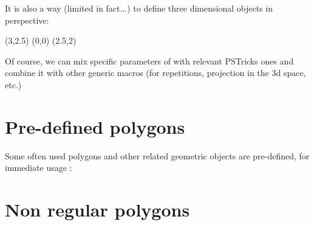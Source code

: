 \documentclass[11pt,english,BCOR10mm,DIV12,bibliography=totoc,parskip=false,smallheadings
    headexclude,footexclude,oneside]{pst-doc}
\begin{document}
\begin{compactdesc}
It is also a way (limited in fact...) to define three dimensional objects in perspective:

\bigskip
\begin{LTXexample}[pos=l,width=0.3\linewidth,pos=l]
\begin{pspicture}(3,2.5)
  \rput[lb](0,0){\PstSquare[PolyName=A]}
    \rput[lb](2.5,2){\PstSquare[unit=0.5,PolyName=B]}
  \end{pspicture}
\end{LTXexample}

\end{compactdesc}

\bigskip
  Of course, we can mix specific parameters of  with
relevant PSTricks ones and combine it with other generic macros
(for repetitions, projection in the 3d space, etc.)


\begin{LTXexample}[pos=t]
  \PstPolygon[unit=1.5]
  \PstPolygon[linewidth=1mm]
  \PstPolygon[fillstyle=crosshatch,PolyNbSides=6]
  \PstPolygon[linecolor=red,fillstyle=solid,fillcolor=yellow,
              PolyRotation=18,PolyOffset=2]
  \PstPolygon*[linecolor=cyan,PolyNbSides=7,PolyOffset=2]
\end{LTXexample}

\begin{LTXexample}[pos=t]
\end{LTXexample}


\section{Pre-defined polygons}
%
  Some often used polygons and other related geometric objects are
pre-defined, for immediate usage :

\begin{LTXexample}[pos=t]
  \PstTriangle 
  \PstSquare
  \PstPentagon[unit=0.5,linestyle=dotted]
  \PstHexagon[fillstyle=hlines,hatchangle=90]
  \PstHeptagon[fillstyle=vlines]
  \PstOctogon*[unit=0.8,linecolor=red]
  \PstNonagon[unit=0.5]
  \PstDecagon
  \PstDodecagon[linecolor=green] \par
  \PstStarFiveLines
  \PstStarFive
\end{LTXexample}


\section{Non regular polygons}
\end{document}
